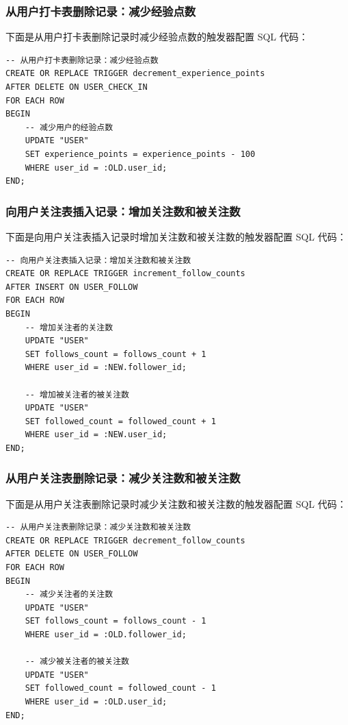 \subsubsection{从用户打卡表删除记录：减少经验点数}

下面是从用户打卡表删除记录时减少经验点数的触发器配置 SQL 代码：

\begin{verbatim}
-- 从用户打卡表删除记录：减少经验点数
CREATE OR REPLACE TRIGGER decrement_experience_points
AFTER DELETE ON USER_CHECK_IN
FOR EACH ROW
BEGIN
    -- 减少用户的经验点数
    UPDATE "USER"
    SET experience_points = experience_points - 100
    WHERE user_id = :OLD.user_id;
END;
\end{verbatim}

\subsubsection{向用户关注表插入记录：增加关注数和被关注数}

下面是向用户关注表插入记录时增加关注数和被关注数的触发器配置 SQL 代码：

\begin{verbatim}
-- 向用户关注表插入记录：增加关注数和被关注数
CREATE OR REPLACE TRIGGER increment_follow_counts
AFTER INSERT ON USER_FOLLOW
FOR EACH ROW
BEGIN
    -- 增加关注者的关注数
    UPDATE "USER"
    SET follows_count = follows_count + 1
    WHERE user_id = :NEW.follower_id;

    -- 增加被关注者的被关注数
    UPDATE "USER"
    SET followed_count = followed_count + 1
    WHERE user_id = :NEW.user_id;
END;
\end{verbatim}

\subsubsection{从用户关注表删除记录：减少关注数和被关注数}

下面是从用户关注表删除记录时减少关注数和被关注数的触发器配置 SQL 代码：

\begin{verbatim}
-- 从用户关注表删除记录：减少关注数和被关注数
CREATE OR REPLACE TRIGGER decrement_follow_counts
AFTER DELETE ON USER_FOLLOW
FOR EACH ROW
BEGIN
    -- 减少关注者的关注数
    UPDATE "USER"
    SET follows_count = follows_count - 1
    WHERE user_id = :OLD.follower_id;

    -- 减少被关注者的被关注数
    UPDATE "USER"
    SET followed_count = followed_count - 1
    WHERE user_id = :OLD.user_id;
END;
\end{verbatim}

